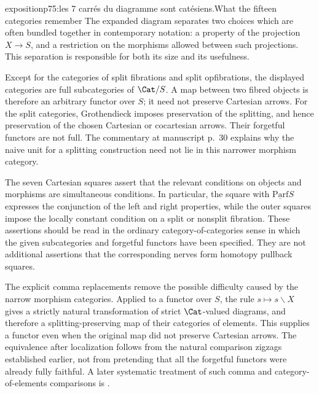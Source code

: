 \begin{dcomment}{exposition}{p75:les 7 carrés du diagramme sont catésiens.}{What the fifteen categories remember}
The expanded diagram separates two choices which are often bundled together in contemporary notation: a property of the projection $X\to S$, and a restriction on the morphisms allowed between such projections. This separation is responsible for both its size and its usefulness.

Except for the categories of split fibrations and split opfibrations, the displayed categories are full subcategories of $\Cat/S$. A map between two fibred objects is therefore an arbitrary functor over $S$; it need not preserve Cartesian arrows. For the split categories, Grothendieck imposes preservation of the splitting, and hence preservation of the chosen Cartesian or cocartesian arrows. Their forgetful functors are not full. The commentary at manuscript p.~30 explains why the naive unit for a splitting construction need not lie in this narrower morphism category.

The seven Cartesian squares assert that the relevant conditions on objects and morphisms are simultaneous conditions. In particular, the square with $\underline{\mathrm{Parf}}S$ expresses the conjunction of the left and right properties, while the outer squares impose the locally constant condition on a split or nonsplit fibration. These assertions should be read in the ordinary category-of-categories sense in which the given subcategories and forgetful functors have been specified. They are not additional assertions that the corresponding nerves form homotopy pullback squares.

The explicit comma replacements remove the possible difficulty caused by the narrow morphism categories. Applied to a functor over $S$, the rule $s\mapsto s\backslash X$ gives a strictly natural transformation of strict $\Cat$-valued diagrams, and therefore a splitting-preserving map of their categories of elements. This supplies a functor even when the original map did not preserve Cartesian arrows. The equivalence after localization follows from the natural comparison zigzags established earlier, not from pretending that all the forgetful functors were already fully faithful. A later systematic treatment of such comma and category-of-elements comparisons is \citet[Theorem~3.8]{Maltsiniotis2005Asphericite}.
\end{dcomment}

